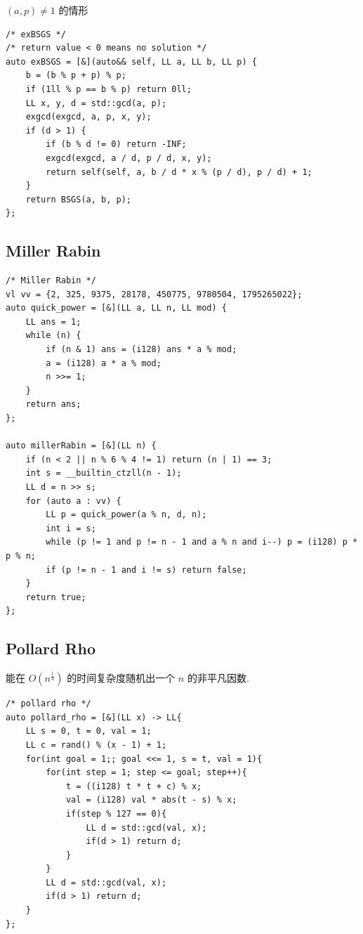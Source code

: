 \documentclass[UTF8, a4paper, titlepage, twoside]{ctexart}
\begin{document}
$(a, p) \neq 1$ 的情形

\begin{lstlisting}[style=cpp]
/* exBSGS */
/* return value < 0 means no solution */
auto exBSGS = [&](auto&& self, LL a, LL b, LL p) {
    b = (b % p + p) % p;
    if (1ll % p == b % p) return 0ll;
    LL x, y, d = std::gcd(a, p);
    exgcd(exgcd, a, p, x, y);
    if (d > 1) {
        if (b % d != 0) return -INF;
        exgcd(exgcd, a / d, p / d, x, y);
        return self(self, a, b / d * x % (p / d), p / d) + 1;
    }
    return BSGS(a, b, p);
};
\end{lstlisting}

\subsection{ Miller Rabin }
\begin{lstlisting}[style=cpp]
/* Miller Rabin */
vl vv = {2, 325, 9375, 28178, 450775, 9780504, 1795265022};
auto quick_power = [&](LL a, LL n, LL mod) {
    LL ans = 1;
    while (n) {
        if (n & 1) ans = (i128) ans * a % mod;
        a = (i128) a * a % mod;
        n >>= 1;
    }
    return ans;
};

auto millerRabin = [&](LL n) {
    if (n < 2 || n % 6 % 4 != 1) return (n | 1) == 3;
    int s = __builtin_ctzll(n - 1);
    LL d = n >> s;
    for (auto a : vv) {
        LL p = quick_power(a % n, d, n);
        int i = s;
        while (p != 1 and p != n - 1 and a % n and i--) p = (i128) p * p % n;
        if (p != n - 1 and i != s) return false;
    }
    return true;
};
\end{lstlisting}

\subsection{ Pollard Rho }
能在 \(O(n^{\frac{1}{4}})\) 的时间复杂度随机出一个 \(n\) 的非平凡因数.

\begin{lstlisting}[style=cpp]
/* pollard rho */
auto pollard_rho = [&](LL x) -> LL{
    LL s = 0, t = 0, val = 1;
    LL c = rand() % (x - 1) + 1;
    for(int goal = 1;; goal <<= 1, s = t, val = 1){
        for(int step = 1; step <= goal; step++){
            t = ((i128) t * t + c) % x;
            val = (i128) val * abs(t - s) % x;
            if(step % 127 == 0){
                LL d = std::gcd(val, x);
                if(d > 1) return d;
            }
        }
        LL d = std::gcd(val, x);
        if(d > 1) return d;
    }
};
\end{lstlisting}
\end{document}
